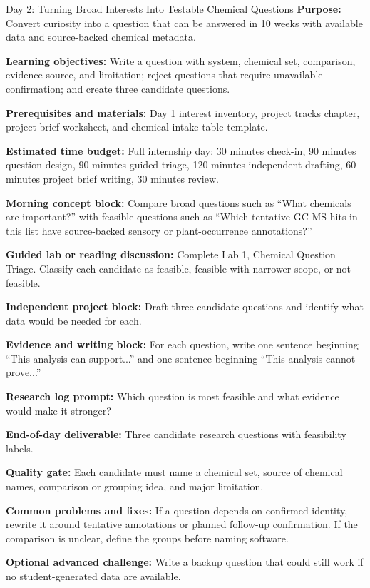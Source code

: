 \begin{dailybox}{Day 2: Turning Broad Interests Into Testable Chemical Questions}
\textbf{Purpose:} Convert curiosity into a question that can be answered in 10 weeks with available data and source-backed chemical metadata.

\textbf{Learning objectives:} Write a question with system, chemical set, comparison, evidence source, and limitation; reject questions that require unavailable confirmation; and create three candidate questions.

\textbf{Prerequisites and materials:} Day 1 interest inventory, project tracks chapter, project brief worksheet, and chemical intake table template.

\textbf{Estimated time budget:} Full internship day: 30 minutes check-in, 90 minutes question design, 90 minutes guided triage, 120 minutes independent drafting, 60 minutes project brief writing, 30 minutes review.

\textbf{Morning concept block:} Compare broad questions such as ``What chemicals are important?'' with feasible questions such as ``Which tentative GC-MS hits in this list have source-backed sensory or plant-occurrence annotations?''

\textbf{Guided lab or reading discussion:} Complete Lab 1, Chemical Question Triage. Classify each candidate as feasible, feasible with narrower scope, or not feasible.

\textbf{Independent project block:} Draft three candidate questions and identify what data would be needed for each.

\textbf{Evidence and writing block:} For each question, write one sentence beginning ``This analysis can support...'' and one sentence beginning ``This analysis cannot prove...''

\textbf{Research log prompt:} Which question is most feasible and what evidence would make it stronger?

\textbf{End-of-day deliverable:} Three candidate research questions with feasibility labels.

\textbf{Quality gate:} Each candidate must name a chemical set, source of chemical names, comparison or grouping idea, and major limitation.

\textbf{Common problems and fixes:} If a question depends on confirmed identity, rewrite it around tentative annotations or planned follow-up confirmation. If the comparison is unclear, define the groups before naming software.

\textbf{Optional advanced challenge:} Write a backup question that could still work if no student-generated data are available.
\end{dailybox}

